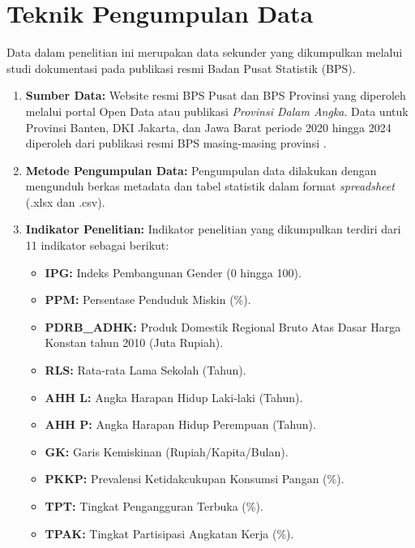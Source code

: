 \section{\normalsize Teknik Pengumpulan Data}
Data dalam penelitian ini merupakan data sekunder yang dikumpulkan melalui studi dokumentasi pada publikasi resmi Badan Pusat Statistik (BPS).
\begin{enumerate}
    \item \textbf{Sumber Data:} Website resmi BPS Pusat dan BPS Provinsi yang diperoleh melalui portal Open Data atau publikasi \textit{Provinsi Dalam Angka}. Data untuk Provinsi Banten, DKI Jakarta, dan Jawa Barat periode 2020 hingga 2024 diperoleh dari publikasi resmi BPS masing-masing provinsi \citep{bps_banten_2020, bps_banten_2021, bps_banten_2022, bps_banten_2023, bps_banten_2024, bps_dki_2020, bps_dki_2021, bps_dki_2022, bps_dki_2023, bps_dki_2024, bps_jabar_2020, bps_jabar_2021, bps_jabar_2022, bps_jabar_2023, bps_jabar_2024}.
    \item \textbf{Metode Pengumpulan Data:} Pengumpulan data dilakukan dengan mengunduh berkas metadata dan tabel statistik dalam format \textit{spreadsheet} (.xlsx dan .csv).
    \item \textbf{Indikator Penelitian:} Indikator penelitian yang dikumpulkan terdiri dari 11 indikator sebagai berikut:
    \begin{itemize}
        \item \textbf{IPG:} Indeks Pembangunan Gender (0 hingga 100).
        \item \textbf{PPM:} Persentase Penduduk Miskin (\%).
        \item \textbf{PDRB\_ADHK:} Produk Domestik Regional Bruto Atas Dasar Harga Konstan tahun 2010 (Juta Rupiah).
        \item \textbf{RLS:} Rata-rata Lama Sekolah (Tahun).
        \item \textbf{AHH L:} Angka Harapan Hidup Laki-laki (Tahun).
        \item \textbf{AHH P:} Angka Harapan Hidup Perempuan (Tahun).
        \item \textbf{GK:} Garis Kemiskinan (Rupiah/Kapita/Bulan).
        \item \textbf{PKKP:} Prevalensi Ketidakcukupan Konsumsi Pangan (\%).
        \item \textbf{TPT:} Tingkat Pengangguran Terbuka (\%).
        \item \textbf{TPAK:} Tingkat Partisipasi Angkatan Kerja (\%).

\end{itemize}
\end{enumerate}
